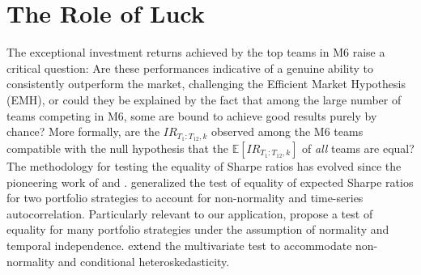 \documentclass[3p,times,twocolumn]{elsarticle}
\begin{document}
\section{The Role of Luck}\label{section:role_of_luck}
The exceptional investment returns achieved by the top teams in M6 raise a critical question: 
Are these performances indicative of a genuine ability to consistently outperform the market, challenging the Efficient Market Hypothesis (EMH), or could they be explained by the fact that among the large number of teams competing in M6, some are bound to achieve good results purely by chance?
More formally, are the $IR_{T_{1}:T_{12},k}$ observed among the M6 teams compatible with the null hypothesis that the $\mathbb{E}[IR_{T_{1}:T_{12},k}]$ of \emph{all} teams are equal?
The methodology for testing the equality of Sharpe ratios has evolved since the pioneering work of \citet{jobsonPerformanceHypothesisTesting1981} and \citet{memmelPerformanceHypothesisTesting2003}.
\citet{ledoitRobustPerformanceHypothesis2008} generalized the test of equality of expected Sharpe ratios for two portfolio strategies to account for non-normality and time-series autocorrelation.
Particularly relevant to our application, \citet{leungTestingEqualityMultiple2008} propose a test of equality for many portfolio strategies under the assumption of normality and temporal independence.
\citet{wrightTestEqualityMultiple2014} extend the multivariate test to accommodate non-normality and conditional heteroskedasticity.
\end{document}
